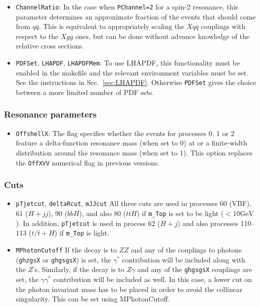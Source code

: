 \documentclass[aps,superscriptaddress,nofootinbib]{revtex4}
\begin{document}
\begin{itemize}
\item \verb|ChannelRatio|: In the case when \verb|PChannel=2| for a spin-2 resonance, this parameter determines an approximate fraction of the events that should come from $q\bar{q}$.  This is equivalent to appropriately scaling the $Xq\bar{q}$ couplings with respect to the $Xgg$ ones, but can be done without advance knowledge of the relative cross sections.
\item \verb|PDFSet|, \verb|LHAPDF|, \verb|LHAPDFMem|: To use LHAPDF, this functionality must be enabled in the makefile and the relevant environment variables must be set.  See the instructions in Sec.~\ref{sec:LHAPDF}.  Otherwise \verb|PDFSet| gives the choice between a more limited number of PDF sets.
\end{itemize}
\subsubsection{Resonance parameters}
\begin{itemize}
\item {\verb|OffshellX|}: The flag specifies whether the events for processes 0, 1 or 2 feature a delta-function resonance mass (when set to 0) at or a finite-width distribution around the resonance mass (when set to 1). This option replaces the \verb|OffXVV| numerical flag in previous versions.
\end{itemize}
\subsubsection{Cuts}
\begin{itemize}
\item \verb|pTjetcut|, \verb|deltaRcut|, \verb|mJJcut| All three cuts are used in processes 60 (VBF), 61 ($H+jj$), 90 ($bbH$), and also 80 ($ttH$) if \verb|m_Top| is set to be light ($<10 \text{GeV}$).  In addition, \verb|pTjetcut| is used in process 62 ($H+j$) and also processes 110--113 ($t/\bar{t}+H$) if \verb|m_Top| is light.
\item \verb|MPhotonCutoff| If the decay is to $ZZ$ and any of the couplings to photons (\verb|ghzgsX| or \verb|ghgsgsX|) is set, the $\gamma^*$ contribution will be included along with the $Z$'s.  Similarly, if the decay is to $Z\gamma$ and any of the \verb|ghgsgsX| couplings are set, the $\gamma\gamma^*$ contribution will be included as well.  In this case, a lower cut on the photon invariant mass has to be placed in order to avoid the collinear singularity.  This can be set using MPhotonCutoff.
\end{itemize}
\end{document}
